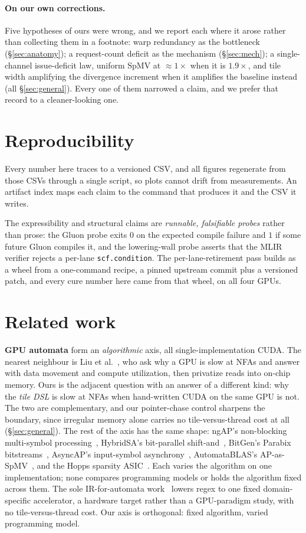 \documentclass[sigplan,anonymous,review,nonacm,10pt]{acmart}
\begin{document}
\paragraph{On our own corrections.} Five hypotheses of ours were wrong, and we report each
where it arose rather than collecting them in a footnote: warp redundancy as the bottleneck
(\S\ref{sec:anatomy}); a request-count deficit as the mechanism (\S\ref{sec:mech}); a
single-channel issue-deficit law, uniform SpMV at ${\approx}1\times$ when it is
$1.9\times$, and tile width amplifying the divergence increment when it amplifies the
baseline instead (all \S\ref{sec:general}). Every one of them narrowed a claim, and we
prefer that record to a cleaner-looking one.

\section{Reproducibility}\label{sec:repro}
Every number here traces to a versioned CSV, and all figures regenerate from those CSVs
through a single script, so plots cannot drift from measurements. An artifact index maps
each claim to the command that produces it and the CSV it writes.

The expressibility and structural claims are \emph{runnable, falsifiable probes} rather than
prose: the Gluon probe exits $0$ on the expected compile failure and $1$ if some future
Gluon compiles it, and the lowering-wall probe asserts that the MLIR verifier rejects a
per-lane \texttt{scf.condition}. The per-lane-retirement pass builds as a wheel from a
one-command recipe, a pinned upstream commit plus a versioned patch, and every cure number
here came from that wheel, on all four GPUs.

\section{Related work}\label{sec:related}
\textbf{GPU automata} form an \emph{algorithmic} axis, all single-implementation CUDA. The
nearest neighbour is Liu et al.~\cite{whyslownfa2020}, who ask why a GPU is slow at NFAs and
answer with data movement and compute utilization, then privatize reads into on-chip memory.
Ours is the adjacent question with an answer of a different kind: why the \emph{tile DSL} is
slow at NFAs when hand-written CUDA on the same GPU is not. The two are complementary, and
our pointer-chase control sharpens the boundary, since irregular memory alone carries no
tile-versus-thread cost at all (\S\ref{sec:general}). The rest of the axis has the same
shape: ngAP's non-blocking multi-symbol processing~\cite{ngap2024}, HybridSA's bit-parallel
shift-and~\cite{hybridsa2024}, BitGen's Parabix bitstreams~\cite{bitgen2025}, AsyncAP's
input-symbol asynchrony~\cite{asyncap2023}, AutomataBLAS's AP-as-SpMV~\cite{automatablas2025},
and the Hopps sparsity ASIC~\cite{hopps2025}. Each varies the algorithm on one
implementation; none compares programming models or holds the algorithm fixed across them.
The sole IR-for-automata work~\cite{mlirregex2025} lowers regex to one fixed
domain-specific accelerator, a hardware target rather than a GPU-paradigm study, with no
tile-versus-thread cost. Our axis is orthogonal: fixed algorithm, varied programming model.
\end{document}
